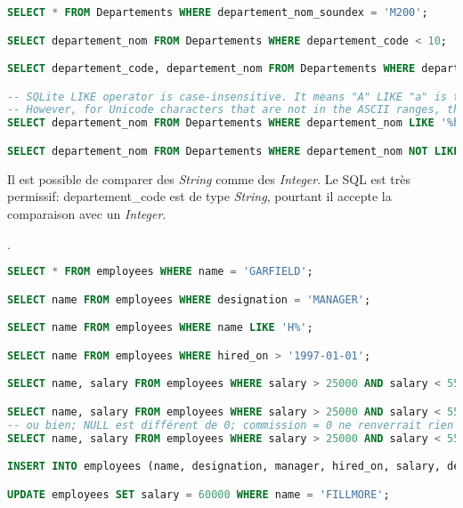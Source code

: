 \documentclass[a4paper,11pt]{article}
\begin{document}
\begin{Form}
\begin{exo}
\begin{enumerate}
\begin{center}
\begin{lstlisting}[language=SQL]
SELECT * FROM Departements WHERE departement_nom_soundex = 'M200';

SELECT departement_nom FROM Departements WHERE departement_code < 10;

SELECT departement_code, departement_nom FROM Departements WHERE departement_code > 20 AND departement_code < 30;

-- SQLite LIKE operator is case-insensitive. It means "A" LIKE "a" is true.
-- However, for Unicode characters that are not in the ASCII ranges, the LIKE operator is case sensitive e.g., "Ä" LIKE "ä" is false
SELECT departement_nom FROM Departements WHERE departement_nom LIKE '%haut%';

SELECT departement_nom FROM Departements WHERE departement_nom NOT LIKE '%-%' AND departement_nom NOT LIKE '% %';
\end{lstlisting}
\label{moncode}
\end{center}
\begin{aretenir}[Remarque]
Il est possible de comparer des \emph{String} comme des \emph{Integer}. Le SQL est très permissif: departement\_code est de type \emph{String}, pourtant il accepte la comparaison avec un \emph{Integer}.
\end{aretenir}
\end{enumerate}.
\end{exo}
\begin{exo}
\begin{center}
\begin{lstlisting}[language=SQL]
SELECT * FROM employees WHERE name = 'GARFIELD';

SELECT name FROM employees WHERE designation = 'MANAGER';

SELECT name FROM employees WHERE name LIKE 'H%';

SELECT name FROM employees WHERE hired_on > '1997-01-01';

SELECT name, salary FROM employees WHERE salary > 25000 AND salary < 55000;

SELECT name, salary FROM employees WHERE salary > 25000 AND salary < 55000 AND commission IS NOT NULL;
-- ou bien; NULL est différent de 0; commission = 0 ne renverrait rien ici
SELECT name, salary FROM employees WHERE salary > 25000 AND salary < 55000 AND commission > 0;

INSERT INTO employees (name, designation, manager, hired_on, salary, dept) VALUES ('DURAN', 'TECH', 6, '1999-01-13', 35000, 4);

UPDATE employees SET salary = 60000 WHERE name = 'FILLMORE';
\end{lstlisting}
\label{moncode}
\end{center}
\end{exo}
\end{Form}
\end{document}
